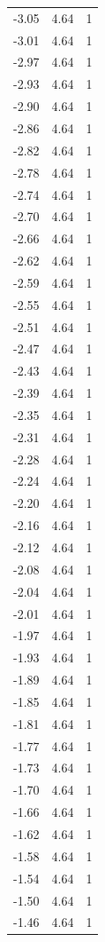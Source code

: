 \begin{longtable}{lrr}
  -3.05 & 4.64 & 1 \\
  -3.01 & 4.64 & 1 \\
  -2.97 & 4.64 & 1 \\
  -2.93 & 4.64 & 1 \\
  -2.90 & 4.64 & 1 \\
  -2.86 & 4.64 & 1 \\
  -2.82 & 4.64 & 1 \\
  -2.78 & 4.64 & 1 \\
  -2.74 & 4.64 & 1 \\
  -2.70 & 4.64 & 1 \\
  -2.66 & 4.64 & 1 \\
  -2.62 & 4.64 & 1 \\
  -2.59 & 4.64 & 1 \\
  -2.55 & 4.64 & 1 \\
  -2.51 & 4.64 & 1 \\
  -2.47 & 4.64 & 1 \\
  -2.43 & 4.64 & 1 \\
  -2.39 & 4.64 & 1 \\
  -2.35 & 4.64 & 1 \\
  -2.31 & 4.64 & 1 \\
  -2.28 & 4.64 & 1 \\
  -2.24 & 4.64 & 1 \\
  -2.20 & 4.64 & 1 \\
  -2.16 & 4.64 & 1 \\
  -2.12 & 4.64 & 1 \\
  -2.08 & 4.64 & 1 \\
  -2.04 & 4.64 & 1 \\
  -2.01 & 4.64 & 1 \\
  -1.97 & 4.64 & 1 \\
  -1.93 & 4.64 & 1 \\
  -1.89 & 4.64 & 1 \\
  -1.85 & 4.64 & 1 \\
  -1.81 & 4.64 & 1 \\
  -1.77 & 4.64 & 1 \\
  -1.73 & 4.64 & 1 \\
  -1.70 & 4.64 & 1 \\
  -1.66 & 4.64 & 1 \\
  -1.62 & 4.64 & 1 \\
  -1.58 & 4.64 & 1 \\
  -1.54 & 4.64 & 1 \\
  -1.50 & 4.64 & 1 \\
  -1.46 & 4.64 & 1 \\

\end{longtable}
